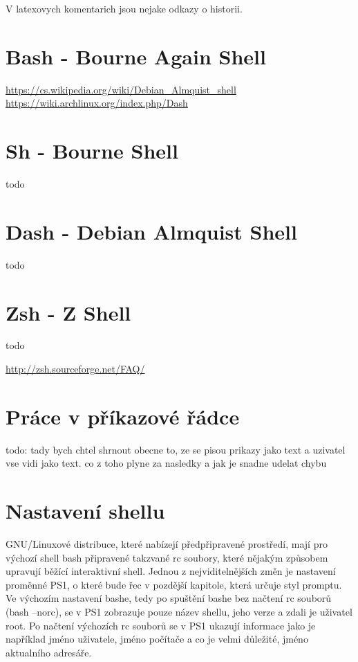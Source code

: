 \documentclass[thesis=M,czech]{FITthesis}[2012/06/26]
\begin{document}
V latexovych komentarich jsou nejake odkazy o historii.







\section{Bash - Bourne Again Shell}

\url{https://cs.wikipedia.org/wiki/Debian_Almquist_shell}
\url{https://wiki.archlinux.org/index.php/Dash}

\section{Sh - Bourne Shell}

todo

\section{Dash - Debian Almquist Shell}

todo

\section{Zsh - Z Shell}

todo

\url{http://zsh.sourceforge.net/FAQ/}

\section{Práce v příkazové řádce}
todo: tady bych chtel shrnout obecne to, ze se pisou prikazy jako text a uzivatel vse vidi jako text. co z toho plyne za nasledky a jak je snadne udelat chybu

\section{Nastavení shellu}

GNU/Linuxové distribuce, které nabízejí předpřipravené prostředí, mají pro výchozí shell bash připravené takzvané rc soubory, které nějakým způsobem upravují běžící interaktivní shell. Jednou z nejviditelnějších změn je nastavení proměnné PS1, o které bude řec v pozdější kapitole, která určuje styl promptu. Ve výchozím nastavení bashe, tedy po spuštění bashe bez načtení rc souborů (bash --norc), se v PS1 zobrazuje pouze název shellu, jeho verze a zdali je uživatel root. Po načtení výchozích rc souborů se v PS1 ukazují informace jako je například jméno uživatele, jméno počítače a co je velmi důležité, jméno aktualního adresáře.
\end{document}
